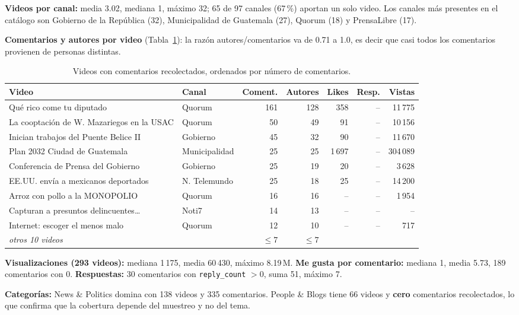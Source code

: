 \documentclass[11pt,a4paper]{article}
\begin{document}
\textbf{Videos por canal:} media 3.02, mediana 1, m\'aximo 32; 65 de 97 canales (67\,\%) aportan un
solo video. Los canales m\'as presentes en el cat\'alogo son Gobierno de la Rep\'ublica (32),
Municipalidad de Guatemala (27), Quorum (18) y PrensaLibre (17).

\textbf{Comentarios y autores por video} (Tabla~\ref{tab:porvideo}): la raz\'on autores/comentarios va
de 0.71 a 1.0, es decir que casi todos los comentarios provienen de personas distintas.

\begin{table}[H]
\centering
\caption{Videos con comentarios recolectados, ordenados por n\'umero de comentarios.}
\label{tab:porvideo}
\small
\begin{tabular}{l l r r r r r}
\toprule
Video & Canal & Coment. & Autores & Likes & Resp. & Vistas \\
\midrule
Qu\'e rico come tu diputado & Quorum & 161 & 128 & 358 & -- & 11\,775 \\
La cooptaci\'on de W. Mazariegos en la USAC & Quorum & 50 & 49 & 91 & -- & 10\,156 \\
Inician trabajos del Puente Belice II & Gobierno & 45 & 32 & 90 & -- & 11\,670 \\
Plan 2032 Ciudad de Guatemala & Municipalidad & 25 & 25 & 1\,697 & -- & 304\,089 \\
Conferencia de Prensa del Gobierno & Gobierno & 25 & 19 & 20 & -- & 3\,628 \\
EE.UU. env\'ia a mexicanos deportados & N. Telemundo & 25 & 18 & 25 & -- & 14\,200 \\
Arroz con pollo a la MONOPOLIO & Quorum & 16 & 16 & -- & -- & 1\,954 \\
Capturan a presuntos delincuentes\dots & Noti7 & 14 & 13 & -- & -- & -- \\
Internet: escoger el menos malo & Quorum & 12 & 10 & -- & -- & 717 \\
\midrule
\multicolumn{2}{l}{\emph{otros 10 videos}} & $\leq 7$ & $\leq 7$ & & & \\
\bottomrule
\end{tabular}
\end{table}

\textbf{Visualizaciones (293 videos):} mediana 1\,175, media 60\,430, m\'aximo 8.19\,M.
\textbf{Me gusta por comentario:} mediana 1, media 5.73, 189 comentarios con 0.
\textbf{Respuestas:} 30 comentarios con \texttt{reply\_count} $>0$, suma 51, m\'aximo 7.

\textbf{Categor\'ias:} News \& Politics domina con 138 videos y 335 comentarios. People \& Blogs tiene
66 videos y \textbf{cero} comentarios recolectados, lo que confirma que la cobertura depende del
muestreo y no del tema.
\end{document}
